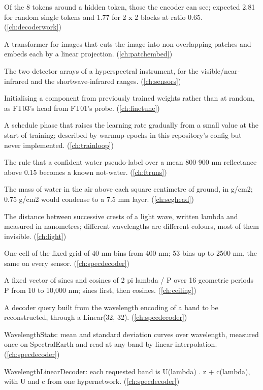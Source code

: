 \begin{description}[style=nextline,leftmargin=1.2em,font=\normalfont\bfseries]
\item[Visible neighbours] Of the 8 tokens around a hidden token, those the encoder can see; expected 2.81 for random single tokens and 1.77 for 2 x 2 blocks at ratio 0.65. (\cref{ch:decoderwork})
\item[Vision Transformer (ViT)] A transformer for images that cuts the image into non-overlapping patches and embeds each by a linear projection. (\cref{ch:patchembed})
\item[VNIR and SWIR detectors] The two detector arrays of a hyperspectral instrument, for the visible/near-infrared and the shortwave-infrared ranges. (\cref{ch:sensors})
\item[Warm start] Initialising a component from previously trained weights rather than at random, as FT03's head from FT01's probe. (\cref{ch:finetune})
\item[Warmup] A schedule phase that raises the learning rate gradually from a small value at the start of training; described by warmup-epochs in this repository's config but never implemented. (\cref{ch:trainloop})
\item[Water guard] The rule that a confident water pseudo-label over a mean 800-900 nm reflectance above 0.15 becomes a known not-water. (\cref{ch:ftruns})
\item[Water vapour column] The mass of water in the air above each square centimetre of ground, in g/cm2; 0.75 g/cm2 would condense to a 7.5 mm layer. (\cref{ch:seghead})
\item[Wavelength] The distance between successive crests of a light wave, written lambda and measured in nanometres; different wavelengths are different colours, most of them invisible. (\cref{ch:light})
\item[Wavelength bin] One cell of the fixed grid of 40 nm bins from 400 nm; 53 bins up to 2500 nm, the same on every sensor. (\cref{ch:specdecoder})
\item[Wavelength encoding] A fixed vector of sines and cosines of 2 pi lambda / P over 16 geometric periods P from 10 to 10,000 nm; sines first, then cosines. (\cref{ch:ceiling})
\item[Wavelength query] A decoder query built from the wavelength encoding of a band to be reconstructed, through a Linear(32, 32). (\cref{ch:specdecoder})
\item[Wavelength statistics] WavelengthStats: mean and standard deviation curves over wavelength, measured once on SpectralEarth and read at any band by linear interpolation. (\cref{ch:specdecoder})
\item[Wavelength-linear decoder] WavelengthLinearDecoder: each requested band is U(lambda) . z + c(lambda), with U and c from one hypernetwork. (\cref{ch:specdecoder})

\end{description}

